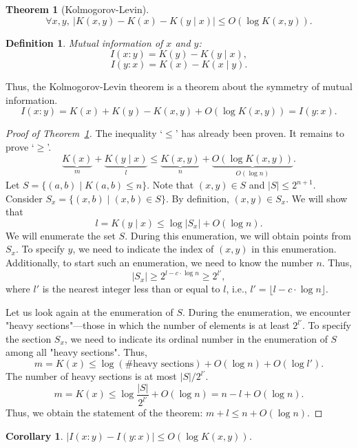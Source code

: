 \documentclass[12pt,sans]{article}
\theoremstyle{definition}
\newtheorem{definition}{Definition}[section]
\theoremstyle{plain}
\newtheorem{theorem}{Theorem}[section]
\newtheorem{corollary}{Corollary}[section]
\theoremstyle{remark}
\begin{document}
\begin{theorem}[Kolmogorov-Levin]\label{thm:kolmogorov-levin}
    \[
        \forall x,y,\ |K(x,y) - K(x) - K(y \mid x)| \le O(\log K(x,y)).
    \]
\end{theorem}

\begin{definition}
    \emph{Mutual information of $x$ and $y$:}
    \[
    I(x:y) = K(y) - K(y \mid x),
    \]
    \[
    I(y:x) = K(x) - K(x \mid y).
    \]
\end{definition}

Thus, the Kolmogorov-Levin theorem is a theorem about the symmetry of mutual information.
\[
I(x:y) = K(x) + K(y) - K(x,y) + O(\log K(x,y)) = I(y:x).
\]

\begin{proof}[Proof of Theorem~\ref{thm:kolmogorov-levin}]
    The inequality `$\le$' has already been proven. It remains to prove `$\ge$'.
    \[
    \underbrace{K(x)}_{m} + \underbrace{K(y \mid x)}_l \le \underbrace{K(x,y)}_n + \underbrace{O(\log K(x,y))}_{O(\log n)}.
    \]
    Let $S = \{(a,b) \mid K(a,b) \le n\}$. Note that $(x,y) \in S$ and $|S| \le 2^{n+1}$.
    Consider $S_x = \{(x,b) \mid (x,b) \in S\}$.
    By definition, $(x,y) \in S_x$.
    We will show that
    \[
    l = K(y \mid x) \le \log |S_x| + O(\log n).
    \]
    We will enumerate the set $S$. During this enumeration, we will obtain points from $S_x$. To specify $y$, we need to indicate the index of $(x,y)$ in this enumeration. Additionally, to start such an enumeration, we need to know the number $n$. Thus,
    \[|S_x| \ge 2^{l - c \cdot \log n} \ge 2^{l'},\]
    where $l'$ is the nearest integer less than or equal to $l$, i.e., $l' = \lfloor l - c \cdot \log n \rfloor$.

    Let us look again at the enumeration of $S$. During the enumeration, we encounter "heavy sections"—those in which the number of elements is at least $2^{l'}$. To specify the section $S_x$, we need to indicate its ordinal number in the enumeration of $S$ among all "heavy sections". Thus,
    \[
    m = K(x) \le \log(\text{\# heavy sections}) + O(\log n) + O(\log l').
    \]
    The number of heavy sections is at most $|S|/2^{l'}$.
    \[
    m = K(x) \le \log \frac{|S|}{2^{l'}} + O(\log n) = n - l + O(\log n).
    \]
    Thus, we obtain the statement of the theorem: $m + l \le n + O(\log n)$.
\end{proof}

\begin{corollary}
    $|I(x:y) - I(y:x)| \le O(\log K(x,y))$.
\end{corollary}
\end{document}
